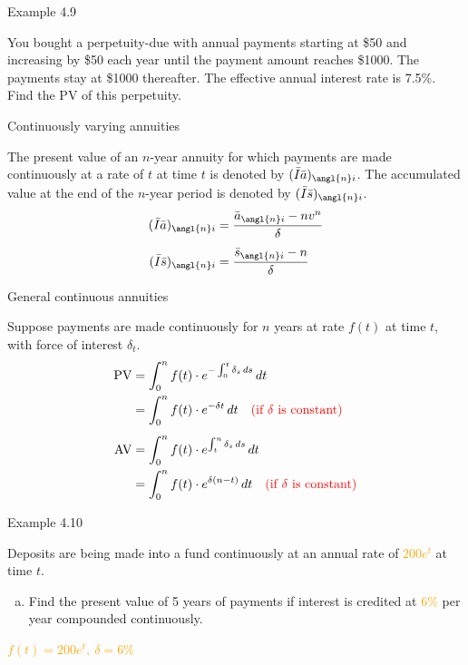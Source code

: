 \documentclass{beamer}
\begin{document}
\begin{frame}{Example 4.9}

You bought a perpetuity-due with annual payments starting at \$50 and increasing by \$50 each year until the payment amount reaches \$1000. The payments stay at \$1000 thereafter. The effective annual interest rate is 7.5\%. Find the PV of this perpetuity.

\bigskip
\begin{center}
\end{center}

\vfill
\end{frame}

\begin{frame}{Continuously varying annuities}

The present value of an $n$-year annuity for which payments are made continuously at a rate of $t$ at time $t$ is denoted by $(\bar{I}\bar{a})_{\angl{n}i}$. The accumulated value at the end of the $n$-year period is denoted by $(\bar{I}\bar{s})_{\angl{n}i}$.
\begin{align*}
(\bar{I}\bar{a})_{\angl{n}i} &= \frac{\bar{a}_{\angl{n}i} - nv^n}{\delta} \\[1ex]
(\bar{I}\bar{s})_{\angl{n}i} &= \frac{\bar{s}_{\angl{n}i} - n}{\delta}
\end{align*}

\end{frame}

\begin{frame}{General continuous annuities}

Suppose payments are made continuously for $n$ years at rate $f(t)$ at time $t$, with force of interest $\delta_t$.
\begin{align*}
\text{PV} &= \int_0^n f(t)\cdot e^{-\int_0^t \delta_s\,ds}\,dt \\
&= \int_0^n f(t)\cdot e^{-\delta t}\,dt \quad \text{\textcolor{red}{(if $\delta$ is constant)}} \\[1ex]
\text{AV} &= \int_0^n f(t)\cdot e^{\int_t^n \delta_s\,ds}\,dt \\
&= \int_0^n f(t)\cdot e^{\delta(n-t)}\,dt \quad \text{\textcolor{red}{(if $\delta$ is constant)}}
\end{align*}

\end{frame}

\begin{frame}{Example 4.10}

Deposits are being made into a fund continuously at an annual rate of \textcolor{orange}{$200e^t$} at time $t$.
\begin{enumerate}[a)]
\item Find the present value of 5 years of payments if interest is credited at \textcolor{orange}{6\%} per year compounded continuously.
\end{enumerate}

\medskip
{\small \textcolor{orange}{$f(t) = 200e^t,\ \delta = 6\%$}}

\vfill
\end{frame}
\end{document}
